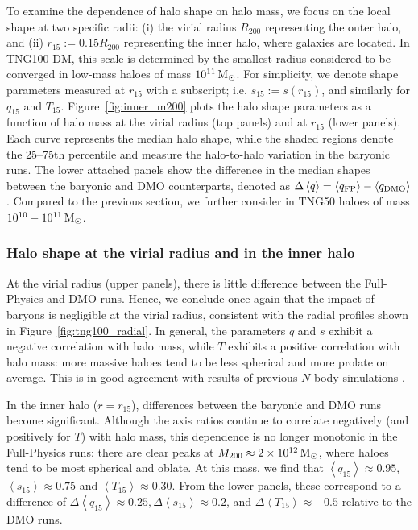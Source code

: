 \documentclass[fleqn,usenatbib]{mnras}
\def\msun{\,\rm M_{\odot}}
\newcommand{\med}[1]{\left<#1\right>}
\begin{document}
To examine the dependence of  halo shape on  halo mass, we focus on the local shape at two specific radii: 
(i) the virial radius $R_{200}$ representing the outer halo, and 
(ii) $r_{15} := 0.15 R_{200}$ representing the inner halo, where galaxies are located.
In TNG100-DM, this scale is determined by the smallest radius considered to be converged in low-mass haloes of mass $10^{11} \msun$.
For simplicity, we denote shape parameters measured at $r_{15}$ with a subscript; i.e. $s_{15} := s(r_{15})$, and similarly for $q_{15}$ and $T_{15}$.
Figure~\ref{fig:inner_m200} plots the halo shape parameters as a function of halo mass at the virial radius (top panels) and at $r_{15}$ (lower panels).
Each curve represents the median halo shape, while the shaded regions denote the 25--75th percentile and measure the halo-to-halo variation in the baryonic runs.
The lower attached panels show the difference in the median shapes between the baryonic and DMO counterparts, denoted as $\Delta\med{q} = \med{q_{\rm FP}} - \med{q_{\rm DMO}}$.
Compared to the previous section, we further consider in TNG50 haloes of mass $10^{10} - 10^{11} \msun$.

\subsubsection*{Halo shape at the virial radius and in the inner halo}

At the virial radius (upper panels), there is little difference between the Full-Physics and DMO runs.
Hence, we conclude once again that the impact of baryons is negligible at the virial radius, consistent with the radial profiles shown in Figure~\ref{fig:tng100_radial}.
In general, the parameters $q$ and $s$ exhibit a negative correlation with halo mass, while $T$ exhibits a positive correlation with halo mass: 
more massive haloes tend to be less spherical and more prolate on average.
This is in good agreement with results of previous $N$-body simulations \citep[e.g.][]{Springel04v220,Allgood06v367,Maccio08v391,Schneider2012}.

In the inner halo ($r = r_{15}$), differences between the baryonic and DMO runs become significant.
Although the axis ratios continue to correlate negatively (and positively for $T$) with halo mass, this dependence is no longer monotonic in the Full-Physics runs:
there are clear peaks at $M_{200} \approx 2\times10^{12} \msun$, where haloes tend to be most spherical and oblate.
At this mass, we find that $\med{q_{15}} \approx 0.95$, $\med{s_{15}} \approx 0.75$ and $\med{T_{15}} \approx 0.30$.
From the lower panels, these correspond to a difference of $\Delta \med{q_{15}} \approx 0.25, \Delta \med{s_{15}} \approx 0.2$, and  $\Delta\med{T_{15}} \approx -0.5$ relative to the DMO runs.
\end{document}
